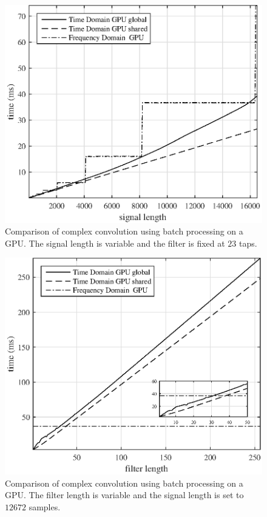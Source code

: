 \begin{figure}
	\centering\includegraphics[width=5in]{figures/gpu_intro/CPUvsGPU_3104batch_21taps_varySignal.eps}
	\caption{Comparison of complex convolution using batch processing on a GPU. The signal length is variable and the filter is fixed at $23$ taps.}
	\label{fig:CPUvsGPU_3104batch_21taps_varySignal}
\end{figure}
\begin{figure}
	\centering\includegraphics[width=5in]{figures/gpu_intro/CPUvsGPU_3104batch_12672signal_varyFilter.eps}
	\caption{Comparison of complex convolution using batch processing on a GPU. The filter length is variable and the signal length is set to $12672$ samples.}
	\label{fig:CPUvsGPU_3104batch_12672signal_varyFilter}
\end{figure}
